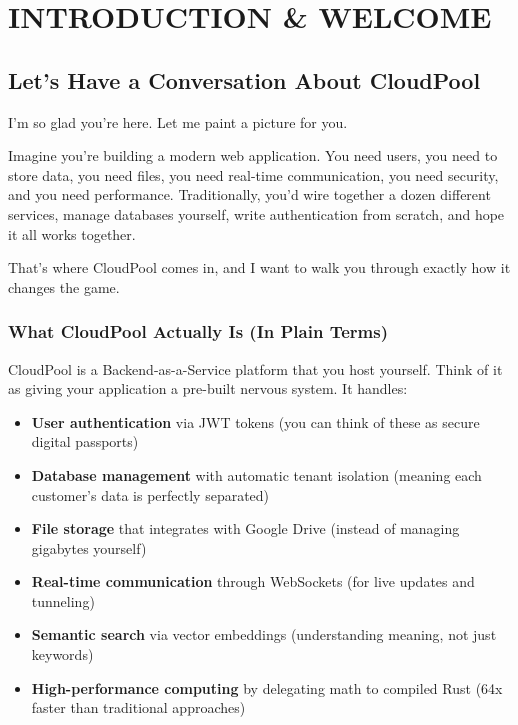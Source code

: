 \documentclass[11pt,a4paper]{report}
\begin{document}
\part{INTRODUCTION \& WELCOME}



\chapter{Let's Have a Conversation About CloudPool}


I'm so glad you're here. Let me paint a picture for you.

Imagine you're building a modern web application. You need users, you need to store data, you need files, you need real-time communication, you need security, and you need performance. Traditionally, you'd wire together a dozen different services, manage databases yourself, write authentication from scratch, and hope it all works together.

That's where CloudPool comes in, and I want to walk you through exactly how it changes the game.


\section{What CloudPool Actually Is (In Plain Terms)}


CloudPool is a Backend-as-a-Service platform that you host yourself. Think of it as giving your application a pre-built nervous system. It handles:

\begin{itemize}
\item \textbf{User authentication} via JWT tokens (you can think of these as secure digital passports)
\item \textbf{Database management} with automatic tenant isolation (meaning each customer's data is perfectly separated)
\item \textbf{File storage} that integrates with Google Drive (instead of managing gigabytes yourself)
\item \textbf{Real-time communication} through WebSockets (for live updates and tunneling)
\item \textbf{Semantic search} via vector embeddings (understanding meaning, not just keywords)
\item \textbf{High-performance computing} by delegating math to compiled Rust (64x faster than traditional approaches)

\end{itemize}
\end{document}
